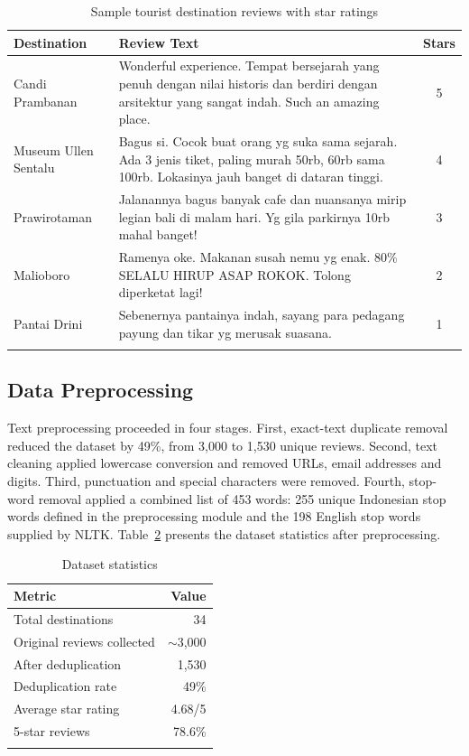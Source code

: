 \documentclass[pdflatex,sn-mathphys-num]{sn-jnl}
\begin{document}
\begin{table}[htbp]
\caption{Sample tourist destination reviews with star ratings}\label{tab2}
\begin{tabular}{@{}p{2.2cm}p{9.6cm}c@{}}
\toprule
Destination & Review Text & Stars\\
\midrule
Candi Prambanan & Wonderful experience. Tempat bersejarah yang penuh dengan nilai historis dan berdiri dengan arsitektur yang sangat indah. Such an amazing place. & 5\\
Museum Ullen Sentalu & Bagus si. Cocok buat orang yg suka sama sejarah. Ada 3 jenis tiket, paling murah 50rb, 60rb sama 100rb. Lokasinya jauh banget di dataran tinggi. & 4\\
Prawirotaman & Jalanannya bagus banyak cafe dan nuansanya mirip legian bali di malam hari. Yg gila parkirnya 10rb mahal banget! & 3\\
Malioboro & Ramenya oke. Makanan susah nemu yg enak. 80\% SELALU HIRUP ASAP ROKOK. Tolong diperketat lagi! & 2\\
Pantai Drini & Sebenernya pantainya indah, sayang para pedagang payung dan tikar yg merusak suasana. & 1\\
\botrule
\end{tabular}
\end{table}

\subsection{Data Preprocessing}\label{subsec2}

Text preprocessing proceeded in four stages. First, exact-text duplicate removal reduced the dataset by 49\%, from 3,000 to 1,530 unique reviews. Second, text cleaning applied lowercase conversion and removed URLs, email addresses and digits. Third, punctuation and special characters were removed. Fourth, stop-word removal applied a combined list of 453 words: 255 unique Indonesian stop words defined in the preprocessing module and the 198 English stop words supplied by NLTK. Table~\ref{tab3} presents the dataset statistics after preprocessing.

\begin{table}[htbp]
\caption{Dataset statistics}\label{tab3}
\begin{tabular}{@{}lr@{}}
\toprule
Metric & Value\\
\midrule
Total destinations & 34\\
Original reviews collected & $\sim$3,000\\
After deduplication & 1,530\\
Deduplication rate & 49\%\\
Average star rating & 4.68/5\\
5-star reviews & 78.6\%\\
\botrule
\end{tabular}
\end{table}
\end{document}
